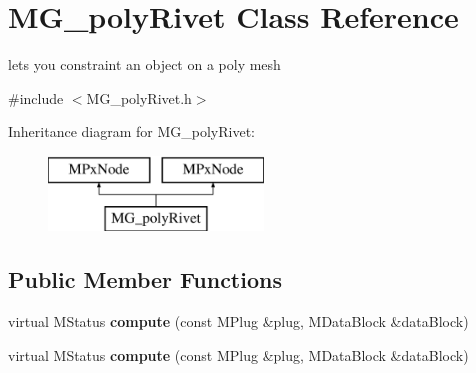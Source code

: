 \hypertarget{class_m_g__poly_rivet}{\section{M\-G\-\_\-poly\-Rivet Class Reference}
\label{class_m_g__poly_rivet}
}


lets you constraint an object on a poly mesh  




{\ttfamily \#include $<$M\-G\-\_\-poly\-Rivet.\-h$>$}

Inheritance diagram for M\-G\-\_\-poly\-Rivet\-:\begin{figure}[H]
\begin{center}
\leavevmode
\includegraphics[height=2.000000cm]{class_m_g__poly_rivet}
\end{center}
\end{figure}
\subsection*{Public Member Functions}
\begin{DoxyCompactItemize}
\item 
\hypertarget{class_m_g__poly_rivet_a4dc8907a9f205585244e8e63c5264332}{virtual M\-Status {\bfseries compute} (const M\-Plug \&plug, M\-Data\-Block \&data\-Block)}\label{class_m_g__poly_rivet_a4dc8907a9f205585244e8e63c5264332}

\item 
\hypertarget{class_m_g__poly_rivet_a4dc8907a9f205585244e8e63c5264332}{virtual M\-Status {\bfseries compute} (const M\-Plug \&plug, M\-Data\-Block \&data\-Block)}\label{class_m_g__poly_rivet_a4dc8907a9f205585244e8e63c5264332}

\end{DoxyCompactItemize}
